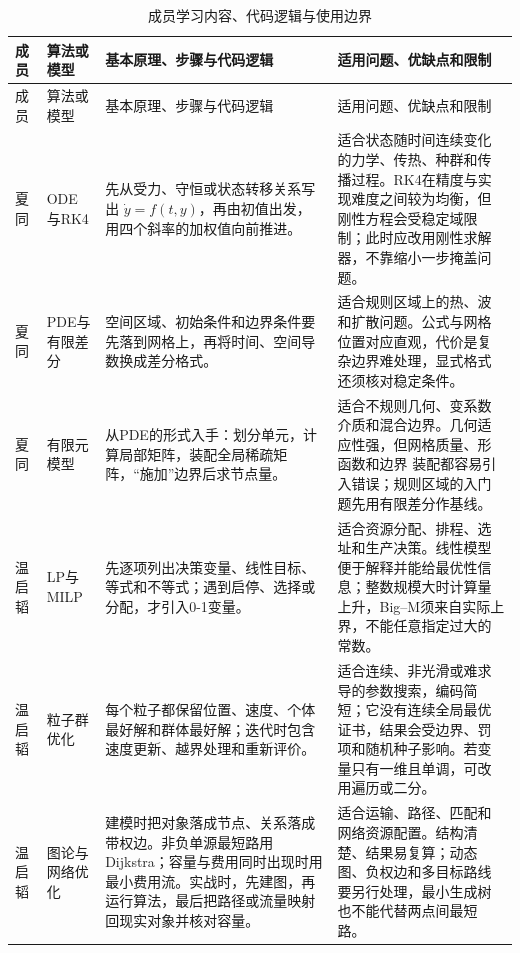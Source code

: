 \documentclass[UTF8,zihao=-4]{ctexart}
\begin{document}
\setlength{\tabcolsep}{2.5pt}
\small
\begin{longtable}{p{1.25cm}p{2.55cm}p{6.25cm}p{5.45cm}}
\caption{成员学习内容、代码逻辑与使用边界}\label{tab:learning-units}\\
\toprule
成员 & 算法或模型 & 基本原理、步骤与代码逻辑 & 适用问题、优缺点和限制\\
\midrule
\endfirsthead
\toprule
成员 & 算法或模型 & 基本原理、步骤与代码逻辑 & 适用问题、优缺点和限制\\
\midrule
\endhead
\bottomrule
\endfoot

夏同 & ODE与RK4
& 先从受力、守恒或状态转移关系写出 $\dot{y}=f(t,y)$，再由初值出发，用四个斜率的加权值向前推进。
& 适合状态随时间连续变化的力学、传热、种群和传播过程。RK4在精度与实现难度之间较为均衡，但刚性方程会受稳定域限制；此时应改用刚性求解器，不靠缩小一步掩盖问题。\\

夏同 & PDE与有限差分
& 空间区域、初始条件和边界条件要先落到网格上，再将时间、空间导数换成差分格式。
& 适合规则区域上的热、波和扩散问题。公式与网格位置对应直观，代价是复杂边界难处理，显式格式还须核对稳定条件。\\

夏同 & 有限元模型
& 从PDE的形式入手：划分单元，计算局部矩阵，装配全局稀疏矩阵，“施加”边界后求节点量。
& 适合不规则几何、变系数介质和混合边界。几何适应性强，但网格质量、形函数和边界
装配都容易引入错误；规则区域的入门题先用有限差分作基线。\\

温启韬 & LP与MILP
& 先逐项列出决策变量、线性目标、等式和不等式；遇到启停、选择或分配，才引入0-1变量。
& 适合资源分配、排程、选址和生产决策。线性模型便于解释并能给最优性信息；整数规模大时计算量上升，Big--M须来自实际上界，不能任意指定过大的常数。\\

温启韬 & 粒子群优化
& 每个粒子都保留位置、速度、个体最好解和群体最好解；迭代时包含速度更新、越界处理和重新评价。
& 适合连续、非光滑或难求导的参数搜索，编码简短；它没有连续全局最优证书，结果会受边界、罚项和随机种子影响。若变量只有一维且单调，可改用遍历或二分。\\

温启韬 & 图论与网络优化
& 建模时把对象落成节点、关系落成带权边。非负单源最短路用Dijkstra；容量与费用同时出现时用最小费用流。实战时，先建图，再运行算法，最后把路径或流量映射回现实对象并核对容量。
& 适合运输、路径、匹配和网络资源配置。结构清楚、结果易复算；动态图、负权边和多目标路线要另行处理，最小生成树也不能代替两点间最短路。\\


\end{longtable}
\end{document}
